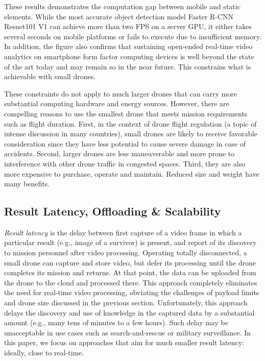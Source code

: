 These results demonstrates the computation gap between mobile and static
elements. While the most accurate object detection model Faster R-CNN Resnet101 V1
can achieve more than two FPS on a server GPU, it either takes several seconds
on  mobile platforms or fails to execute due to insufficient memory. In
addition, the figure also confirms that sustaining open-ended real-time video
analytics on smartphone form factor computing devices is well beyond the state
of the art today and may remain so in the near future.  This constrains what is
achievable with small drones.  

These constraints do not apply to much larger drones that can carry
more substantial computing hardware and energy sources.  However,
there are compelling reasons to use the smallest drone that meets
mission requirements such as flight duration.  First, in the context
of drone flight regulation (a topic of intense discussion in many
countries), small drones are likely to receive favorable consideration
since they have less potential to cause severe damage in case of
accidents.  Second, larger drones are less maneuverable and more prone
to interference with other drone traffic in congested spaces.  Third,
they are also more expensive to purchase, operate and maintain.
Reduced size and weight have many benefits.

\subsection{\large Result Latency, Offloading \& Scalability}
\label{bw:offloading}

{\em Result latency} is the delay between first capture of a video frame in
which a particular result (e.g., image of a survivor) is present, and report of
its discovery to mission personnel after video processing.  Operating totally
disconnected, a small drone can capture and store video, but defer its
processing until the drone completes its mission and returns.  At that point,
the data can be uploaded from the drone to the cloud and processed there.  This
approach completely eliminates the need for real-time video processing,
obviating the challenges of payload limits and drone size discussed in the
previous section.  Unfortunately, this approach delays the discovery and use of
knowledge in the captured data by a substantial amount (e.g., many tens of
minutes to a few hours).  Such delay may be unacceptable in use cases such as
search-and-rescue or military surveillance.  In this paper, we focus on
approaches that aim for much smaller result latency: ideally, close to
real-time.


